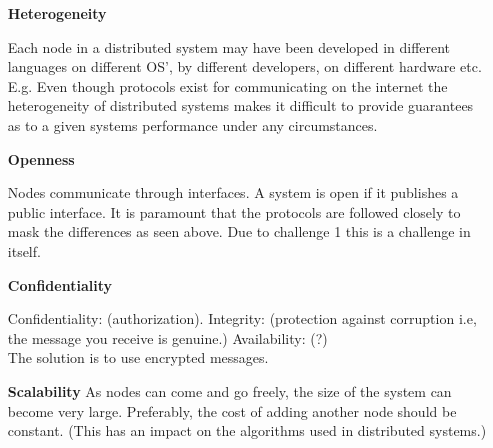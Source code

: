 \begin{enumerate}

\item [\textbf{Heterogeneity}]

Each node in a distributed system may have been developed in different languages on different OS', by different developers, on different hardware etc.\\

E.g. Even though protocols exist for communicating on the internet the heterogeneity of distributed systems makes it difficult to provide guarantees as to a given systems performance under any circumstances.  \\

\item[\textbf{Openness}]


Nodes communicate through interfaces. A system is open if it publishes a public interface. It is paramount that the protocols are followed closely to mask the differences as seen above. Due to challenge 1 this is a challenge in itself.\\


\item[\textbf{Confidentiality}]

Confidentiality: (authorization). Integrity: (protection against corruption i.e, the message you receive is genuine.) Availability: (?)\\

The solution is to use encrypted messages.\\

\item[\textbf{Scalability}]
As nodes can come and go freely, the size of the system can become very large. Preferably, the cost of adding another node should be constant. (This has an impact on the algorithms used in distributed systems.)\\


\end{enumerate}
